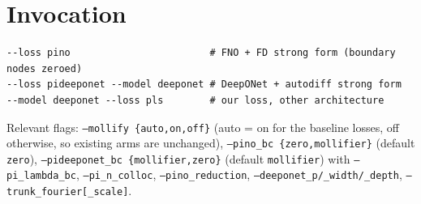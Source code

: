 \documentclass[11pt]{article}
\begin{document}
\section*{Invocation}

\begin{verbatim}
--loss pino                        # FNO + FD strong form (boundary nodes zeroed)
--loss pideeponet --model deeponet # DeepONet + autodiff strong form
--model deeponet --loss pls        # our loss, other architecture
\end{verbatim}
Relevant flags: \texttt{--mollify \{auto,on,off\}} (auto = on for the baseline losses, off
otherwise, so existing arms are unchanged), \texttt{--pino\_bc \{zero,mollifier\}} (default
\texttt{zero}), \texttt{--pideeponet\_bc \{mollifier,zero\}} (default \texttt{mollifier}) with
\texttt{--pi\_lambda\_bc}, \texttt{--pi\_n\_colloc}, \texttt{--pino\_reduction},
\texttt{--deeponet\_p/\_width/\_depth}, \texttt{--trunk\_fourier[\_scale]}.
\end{document}
